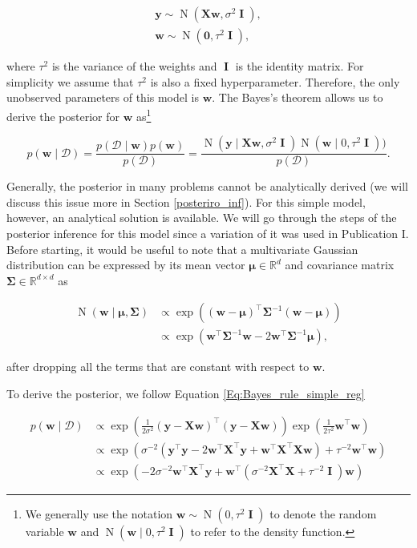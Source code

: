 \documentclass[dissertation,math,vertlayout,pdfa,colorlinks]{aaltoseries}
\newcommand{\bw}{\bm{w}}
\newcommand{\bX}{\bm{X}}
\newcommand{\by}{\bm{y}}
\newcommand{\bD}{\mathcal{D}}
\DeclareMathOperator{\eye}{\textbf{I}}
\DeclareMathOperator{\normalpdf}{N}
\newcommand{\tp}{^{\top}}
\begin{document}
\begin{align}\label{Eq:simple_Bayesian_regression} 
\by \sim \normalpdf(\bX\bw,\sigma^2 \eye),\\
\bw \sim \normalpdf(\textbf{0},\tau^2 \eye), \nonumber
\end{align}

\noindent where $\tau^2$ is the variance of the weights and $\eye$ is the identity matrix. For simplicity we assume that $\tau^2$ is also a fixed hyperparameter. Therefore, the only unobserved parameters of this model is $\bw$. The Bayes's theorem allows us to derive the posterior for $\bw$ as\footnote{We generally use the notation $\bw \sim \normalpdf(0,\tau^2 \eye)$ to denote the random variable $\bw$ and $\normalpdf(\bw\mid 0,\tau^2 \eye)$ to refer to the density function.}

\begin{equation}\label{Eq:Bayes_rule_simple_reg}
p(\bw \mid \bD) = \frac{p(\bD \mid \bw)p(\bw)}{p(\bD)} = \frac{\normalpdf(\by \mid \bX \bw,\sigma^2 \eye) \normalpdf(\bw \mid 0,\tau^2 \eye))}{p(\bD)}.
\end{equation}  

Generally, the posterior in many problems cannot be analytically derived (we will discuss this issue more in Section \ref{posteriro_inf}). For this simple model, however, an analytical solution is available. We will go through the steps of the posterior inference for this model since a variation of it was used in Publication I. Before starting, it would be useful to note that a multivariate Gaussian distribution can be expressed by its mean vector $\bm{\mu}\in \mathbb{R}^d$ and covariance matrix $\bm{\Sigma}\in \mathbb{R}^{d \times d}$ as  

\begin{align}\label{Eq:multi_Gauss}
\normalpdf(\bw \mid \bm{\mu},\bm{\Sigma}) &\propto \exp \left ((\bw - \bm{\mu})\tp\bm{\Sigma}^{-1}(\bw - \bm{\mu}) \right) \nonumber\\
&\propto \exp \left ( \bw\tp\bm{\Sigma}^{-1}\bw -  2\bw\tp\bm{\Sigma}^{-1}\bm{\mu} \right),
\end{align}

\noindent after dropping all the terms that are constant with respect to $\bw$. 

To derive the posterior, we follow Equation \ref{Eq:Bayes_rule_simple_reg} 

\begin{align} \label{Eq:lin_rel_simple_derivation}
p(\bw \mid \bD) &\propto \exp \left(\frac{1}{2\sigma^2} (\by - \bX \bw)\tp(\by - \bX \bw)\right) \exp(\frac{1}{2\tau^2}\bw\tp\bw) \nonumber\\ 
&\propto \exp \left (\sigma^{-2}(\by\tp\by - 2\bw\tp\bX\tp\by + \bw\tp\bX\tp\bX\bw)+ \tau^{-2}\bw\tp\bw \right) \nonumber\\
&\propto \exp \left ( -2\sigma^{-2}\bw\tp\bX\tp\by + \bw\tp( \sigma^{-2}\bX\tp\bX + \tau^{-2} \eye )\bw \right) %
\end{align}    
 
\end{document}
